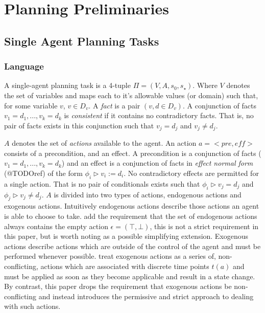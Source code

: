 \documentclass{article}
\theoremstyle{plain}
\theoremstyle{definition}
\begin{document}
\section{Planning Preliminaries}

\subsection{Single Agent Planning Tasks}
\subsubsection*{Language}
A single-agent planning task is a 4-tuple $\Pi=(V, A, s_0, s_\star)$. Where $V$ denotes the set of variables and maps each to it's allowable values (or domain) such that, for some variable $v$, $v \in D_v$. A \textit{fact} is a pair $(v, d \in D_v)$. A conjunction of facts $v_1=d_1,...,v_k=d_k$ is \textit{consistent} if it contains no contradictory facts. That is, no pair of facts exists in this conjunction such that $v_j=d_j$ and $v_j \neq d_j$.

$A$ denotes the set of \textit{actions} available to the agent. An action $a=<pre,eff>$ consists of a precondition, and an effect. A precondition is a conjunction of facts ($v_1=d_1,...,v_k=d_k$) and an effect is a conjunction of facts in \textit{effect normal form} (@TODOref) of the form $\phi_i \triangleright v_i:=d_i$. No contradictory effects are permitted for a single action. That is no pair of conditionals exists such that $\phi_i \triangleright v_j=d_j$ and $\phi_j \triangleright v_j \neq d_j$. $A$ is divided into two types of actions, endogenous actions and exogenous actions. Intuitively endogenous actions describe those actions an agent is able to choose to take. \citet{lind2019ethical} add the requirement that the set of endogenous actions always contains the empty action $\epsilon=(\top,\bot)$, this is not a strict requirement in this paper, but is worth noting as a possible simplifying extension. Exogenous actions describe actions which are outside of the control of the agent and must be performed whenever possible. \citet{lind2019ethical} treat exogenous actions as a series of, non-conflicting, actions which are associated with discrete time points $t(a)$ and must be applied as soon as they become applicable and result in a state change. By contrast, this paper drops the requirement that exogenous actions be non-conflicting and instead introduces the permissive and strict approach to dealing with such actions.
\end{document}
